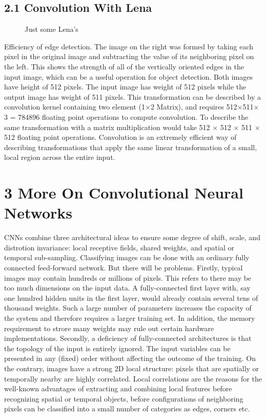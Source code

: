 \documentclass[11pt]{article}
\begin{document}
\subsection{2.1 Convolution With Lena}
\begin{figure}[H]
    \centering
    \qquad
    \caption{Just some Lena's}%
    \label{fig:example}
\end{figure}
\hspace*{1cm}Efficiency of edge detection. The image on the right was formed by taking each pixel in the original image and subtracting the value of its neighboring pixel on the left. This shows the strength of all of the vertically oriented edges in the input image, which can be a useful operation for object detection. Both images have height of 512 pixels. The input image has weight of 512 pixels while the output image has weight of 511 pixels. This transformation can be described by a convolution kernel containing two element (1$\times$2 Matrix), and requires 512$\times$511$\times$3 = 784896 floating point operations to compute convolution. To describe the same transformation with a matrix multiplication would take 512 $\times$ 512 $\times$ 511 $\times$ 512 floating point operations. Convolution is an extremely efficient way of describing transformations that apply the same linear transformation of a small, local region across the entire input. 



\section{3 More On Convolutional Neural Networks}
\hspace*{1cm}CNNs combine three architectural ideas to ensure some degree of shift, scale, and distrotion invariance: local receptive fields, shared weights, and spatial or temporal sub-sampling. Classifying images can be done with an ordinary fully connected feed-forward network. But there will be problems. Firstly, typical images may contain hundreds or millions of pixels. This refers to there may be too much dimensions on the input data. A fully-connected first layer with, say one hundred hidden units in the first layer, would already contain several tens of thousand weights. Such a large number of parameters increases the capacity of the system and therefore requires a larger training set. In addition, the memory requirement to strore many weights may rule out certain hardware implementations. Secondly, a deficiency of fully-connected architectures is that the topology of the input is entirely ignored. The input variables can be presented in any (fixed) order without affecting the outcome of the training. On the contrary, images have a strong 2D local structure: pixels that are spatially or temporally nearby are highly correlated. Local correlations are the reasons for the well-known advantages of extracting and combining local features before recognizing spatial or temporal objects, before configurations of neighboring pixels can be classified into a small number of categories as edges, corners etc. \cite{lecun1998gradient}
\end{document}
